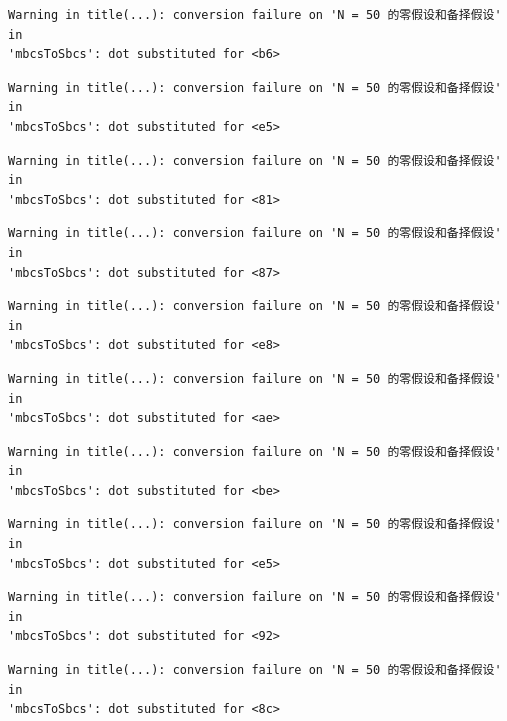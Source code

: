 \documentclass[
  letterpaper,
  DIV=11,
  numbers=noendperiod]{scrreprt}
\begin{document}
\begin{verbatim}
Warning in title(...): conversion failure on 'N = 50 的零假设和备择假设' in
'mbcsToSbcs': dot substituted for <b6>
\end{verbatim}

\begin{verbatim}
Warning in title(...): conversion failure on 'N = 50 的零假设和备择假设' in
'mbcsToSbcs': dot substituted for <e5>
\end{verbatim}

\begin{verbatim}
Warning in title(...): conversion failure on 'N = 50 的零假设和备择假设' in
'mbcsToSbcs': dot substituted for <81>
\end{verbatim}

\begin{verbatim}
Warning in title(...): conversion failure on 'N = 50 的零假设和备择假设' in
'mbcsToSbcs': dot substituted for <87>
\end{verbatim}

\begin{verbatim}
Warning in title(...): conversion failure on 'N = 50 的零假设和备择假设' in
'mbcsToSbcs': dot substituted for <e8>
\end{verbatim}

\begin{verbatim}
Warning in title(...): conversion failure on 'N = 50 的零假设和备择假设' in
'mbcsToSbcs': dot substituted for <ae>
\end{verbatim}

\begin{verbatim}
Warning in title(...): conversion failure on 'N = 50 的零假设和备择假设' in
'mbcsToSbcs': dot substituted for <be>
\end{verbatim}

\begin{verbatim}
Warning in title(...): conversion failure on 'N = 50 的零假设和备择假设' in
'mbcsToSbcs': dot substituted for <e5>
\end{verbatim}

\begin{verbatim}
Warning in title(...): conversion failure on 'N = 50 的零假设和备择假设' in
'mbcsToSbcs': dot substituted for <92>
\end{verbatim}

\begin{verbatim}
Warning in title(...): conversion failure on 'N = 50 的零假设和备择假设' in
'mbcsToSbcs': dot substituted for <8c>
\end{verbatim}
\end{document}
